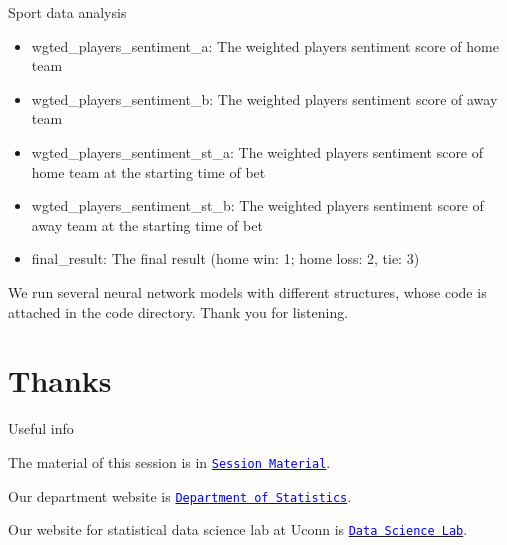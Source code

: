 \documentclass{beamer}
\begin{document}
\begin{frame}[fragile]{Sport data analysis}
\begin{itemize}
	\item wgted\_players\_sentiment\_a: The weighted players sentiment score of home team
	\item wgted\_players\_sentiment\_b: The weighted players sentiment score of away team
	\item wgted\_players\_sentiment\_st\_a: The weighted players sentiment score of home team at the starting time of bet
	\item wgted\_players\_sentiment\_st\_b: The weighted players sentiment score of away team at the starting time of bet
	\item final\_result: The final result (home win: 1; home loss: 2, tie: 3)
\end{itemize}
We run several neural network models with different structures, whose code is attached in the code directory. Thank you for listening. \oakleaf
\end{frame}



\section{Thanks}


\begin{frame}{Useful info}

The material of this session is in \href{https://github.com/brucejunjin/ucsas2020}{\tt \textcolor{blue}{Session Material}}.
\par
Our department website is \href{https://stat.uconn.edu/}{\tt \textcolor{blue}{Department of Statistics}}.
\par
Our website for statistical data science lab at Uconn is \href{https://statds.org/}{\tt \textcolor{blue}{Data Science Lab}}.

\end{frame}
\end{document}
